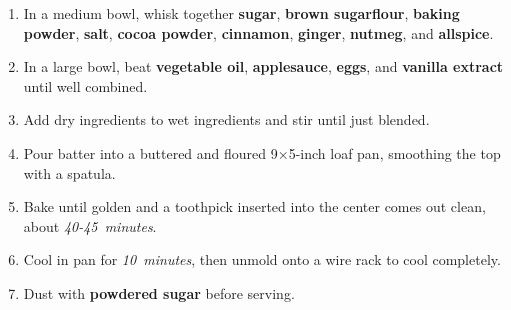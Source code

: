 \documentclass[11pt,letterpaper]{article}
\begin{document}
\begin{enumerate}
    \item In a medium bowl, whisk together \textbf{sugar}, \textbf{brown sugar}\textbf{flour}, \textbf{baking powder}, \textbf{salt}, \textbf{cocoa powder}, \textbf{cinnamon}, \textbf{ginger}, \textbf{nutmeg}, and \textbf{allspice}.
    
    \item In a large bowl, beat \textbf{vegetable oil}, \textbf{applesauce}, \textbf{eggs}, and \textbf{vanilla extract} until well combined.
    
    \item Add dry ingredients to wet ingredients and stir until just blended.
    
    \item Pour batter into a buttered and floured 9×5-inch loaf pan, smoothing the top with a spatula.
    
    \item Bake until golden and a toothpick inserted into the center comes out clean, about \textit{40-45~minutes}.
    
    \item Cool in pan for \textit{10~minutes}, then unmold onto a wire rack to cool completely.
    
    \item Dust with \textbf{powdered sugar} before serving.
\end{enumerate}
\end{document}
